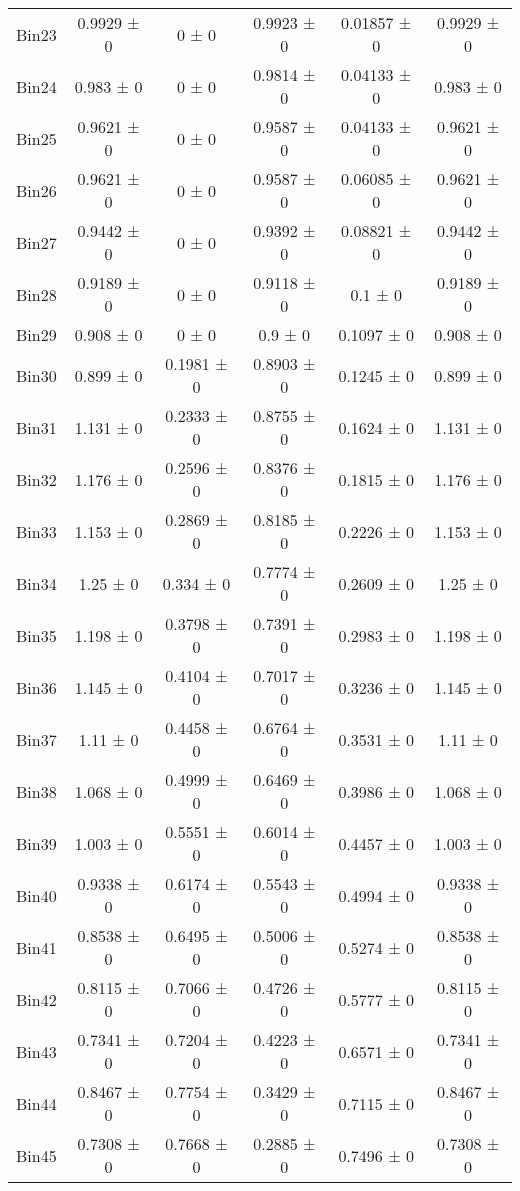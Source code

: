 \begin{tabular}{@{\extracolsep{4pt}}lccccc@{}}
     Bin23 & 0.9929 ± 0 & 0 ± 0 & 0.9923 ± 0 & 0.01857 ± 0 & 0.9929 ± 0 \\ 
     Bin24 & 0.983 ± 0 & 0 ± 0 & 0.9814 ± 0 & 0.04133 ± 0 & 0.983 ± 0 \\ 
     Bin25 & 0.9621 ± 0 & 0 ± 0 & 0.9587 ± 0 & 0.04133 ± 0 & 0.9621 ± 0 \\ 
     Bin26 & 0.9621 ± 0 & 0 ± 0 & 0.9587 ± 0 & 0.06085 ± 0 & 0.9621 ± 0 \\ 
     Bin27 & 0.9442 ± 0 & 0 ± 0 & 0.9392 ± 0 & 0.08821 ± 0 & 0.9442 ± 0 \\ 
     Bin28 & 0.9189 ± 0 & 0 ± 0 & 0.9118 ± 0 & 0.1 ± 0 & 0.9189 ± 0 \\ 
     Bin29 & 0.908 ± 0 & 0 ± 0 & 0.9 ± 0 & 0.1097 ± 0 & 0.908 ± 0 \\ 
     Bin30 & 0.899 ± 0 & 0.1981 ± 0 & 0.8903 ± 0 & 0.1245 ± 0 & 0.899 ± 0 \\ 
     Bin31 & 1.131 ± 0 & 0.2333 ± 0 & 0.8755 ± 0 & 0.1624 ± 0 & 1.131 ± 0 \\ 
     Bin32 & 1.176 ± 0 & 0.2596 ± 0 & 0.8376 ± 0 & 0.1815 ± 0 & 1.176 ± 0 \\ 
     Bin33 & 1.153 ± 0 & 0.2869 ± 0 & 0.8185 ± 0 & 0.2226 ± 0 & 1.153 ± 0 \\ 
     Bin34 & 1.25 ± 0 & 0.334 ± 0 & 0.7774 ± 0 & 0.2609 ± 0 & 1.25 ± 0 \\ 
     Bin35 & 1.198 ± 0 & 0.3798 ± 0 & 0.7391 ± 0 & 0.2983 ± 0 & 1.198 ± 0 \\ 
     Bin36 & 1.145 ± 0 & 0.4104 ± 0 & 0.7017 ± 0 & 0.3236 ± 0 & 1.145 ± 0 \\ 
     Bin37 & 1.11 ± 0 & 0.4458 ± 0 & 0.6764 ± 0 & 0.3531 ± 0 & 1.11 ± 0 \\ 
     Bin38 & 1.068 ± 0 & 0.4999 ± 0 & 0.6469 ± 0 & 0.3986 ± 0 & 1.068 ± 0 \\ 
     Bin39 & 1.003 ± 0 & 0.5551 ± 0 & 0.6014 ± 0 & 0.4457 ± 0 & 1.003 ± 0 \\ 
     Bin40 & 0.9338 ± 0 & 0.6174 ± 0 & 0.5543 ± 0 & 0.4994 ± 0 & 0.9338 ± 0 \\ 
     Bin41 & 0.8538 ± 0 & 0.6495 ± 0 & 0.5006 ± 0 & 0.5274 ± 0 & 0.8538 ± 0 \\ 
     Bin42 & 0.8115 ± 0 & 0.7066 ± 0 & 0.4726 ± 0 & 0.5777 ± 0 & 0.8115 ± 0 \\ 
     Bin43 & 0.7341 ± 0 & 0.7204 ± 0 & 0.4223 ± 0 & 0.6571 ± 0 & 0.7341 ± 0 \\ 
     Bin44 & 0.8467 ± 0 & 0.7754 ± 0 & 0.3429 ± 0 & 0.7115 ± 0 & 0.8467 ± 0 \\ 
     Bin45 & 0.7308 ± 0 & 0.7668 ± 0 & 0.2885 ± 0 & 0.7496 ± 0 & 0.7308 ± 0 \\ 

\end{tabular}

